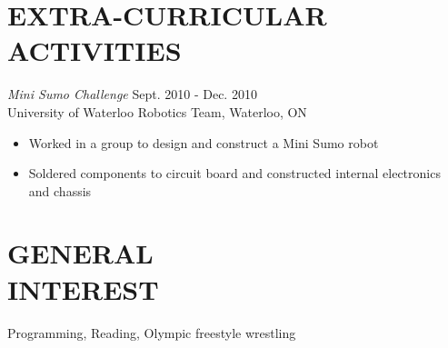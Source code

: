\documentclass[margin]{res}
\begin{document}
\begin{resume}
\section{EXTRA-CURRICULAR \\ ACTIVITIES}
{\it Mini Sumo Challenge}  \hfill Sept. 2010 - Dec. 2010\\
University of Waterloo Robotics Team, Waterloo, ON
\begin{itemize} \itemsep -2pt
  \item Worked in a group to design and construct a Mini Sumo robot
  \item Soldered components to circuit board and constructed internal electronics and chassis
\end{itemize}

\section{GENERAL\\INTEREST}
  Programming, Reading, Olympic freestyle wrestling

\end{resume}
\end{document}

